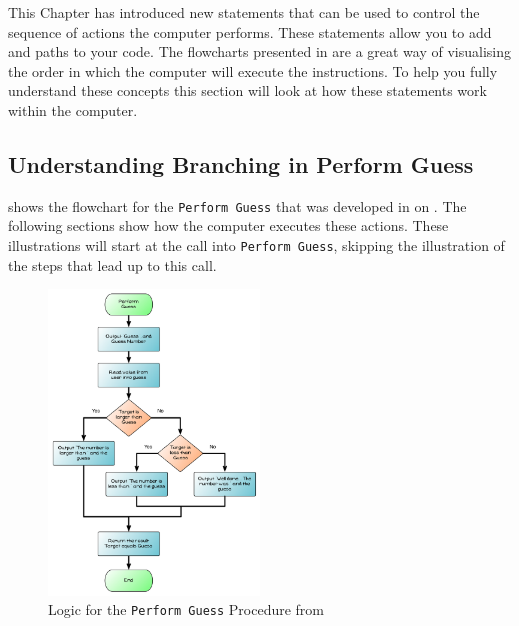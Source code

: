 This Chapter has introduced new statements that can be used to control the sequence of actions the computer performs. These statements allow you to add  and  paths to your code. The flowcharts presented in  are a great way of visualising the order in which the computer will execute the instructions. To help you fully understand these concepts this section will look at how these statements work within the computer.

\subsection{Understanding Branching in Perform Guess} %
\label{sub:understanding_branching_in_perform_guess}

 shows the flowchart for the \texttt{Perform Guess} that was developed in  on . The following sections show how the computer executes these actions. These illustrations will start at the call into \texttt{Perform Guess}, skipping the illustration of the steps that lead up to this call.

\begin{figure}[htbp]
   \centering
   \includegraphics[width=0.5\textwidth]{./topics/control-flow/diagrams/PerformGuess5} 
   \caption{Logic for the \texttt{Perform Guess} Procedure from }
   \label{fig:perform-guess-understanding}
\end{figure}

